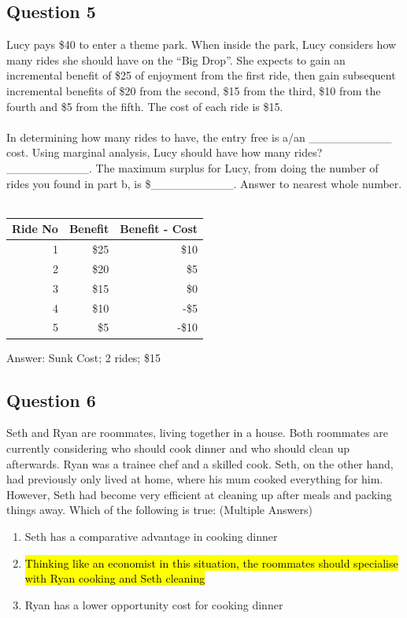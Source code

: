 \subsection{Question 5}
Lucy pays \$40 to enter a theme park. When inside the park, Lucy considers how many rides she should have on the ``Big Drop''. She expects to gain an incremental benefit of \$25 of enjoyment from the first ride, then gain subsequent incremental benefits of \$20 from the second, \$15 from the third, \$10 from the fourth and \$5 from the fifth. The cost of each ride is \$15.\\\\
In determining how many rides to have, the entry free is a/an \_\_\_\_\_\_\_\_\_\_ cost. Using marginal analysis, Lucy should have how many rides? \_\_\_\_\_\_\_\_\_\_. The maximum surplus for Lucy, from doing the number of rides you found in part b, is \$\_\_\_\_\_\_\_\_\_\_. Answer to nearest whole number.\\\\
\begin{table}[H]
	\centering
	\begin{tabular}{rrr}
		Ride No & Benefit & Benefit - Cost\\\hline
		1 & \$25 & \$10\\
		2 & \$20 & \$5\\
		3 & \$15 & \$0\\
		4 & \$10 & -\$5\\
		5 & \$5 & -\$10
	\end{tabular}
\end{table}
Answer: Sunk Cost; 2 rides; \$15

\subsection{Question 6}
Seth and Ryan are roommates, living together in a house. Both roommates are currently considering who should cook dinner and who should clean up afterwards. Ryan was a trainee chef and a skilled cook. Seth, on the other hand, had previously only lived at home, where his mum cooked everything for him. However, Seth had become very efficient at cleaning up after meals and packing things away. Which of the following is true: (Multiple Answers)
\begin{enumerate}
	\item Seth has a comparative advantage in cooking dinner
	\item \hl{Thinking like an economist in this situation, the roommates should specialise with Ryan cooking and Seth cleaning}
	\item Ryan has a lower opportunity cost for cooking dinner
\end{enumerate}

